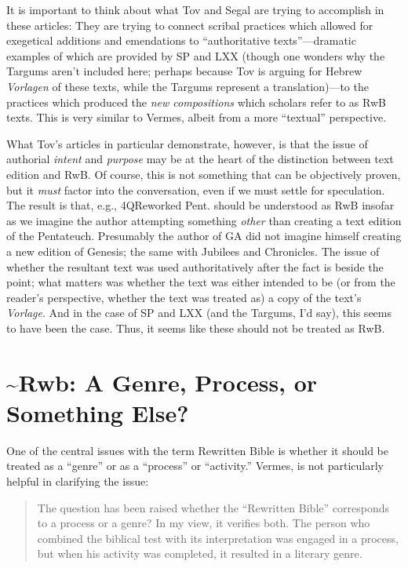 It is important to think about what Tov and Segal are trying to
accomplish in these articles: They are trying to connect scribal
practices which allowed for exegetical additions and emendations to
``authoritative texts''---dramatic examples of which are provided by SP
and LXX (though one wonders why the Targums aren't included here;
perhaps because Tov is arguing for Hebrew \emph{Vorlagen} of these
texts, while the Targums represent a translation)---to the practices
which produced the \emph{new compositions} which scholars refer to as
RwB texts. This is very similar to Vermes, albeit from a more
``textual'' perspective.

What Tov's articles in particular demonstrate, however, is that the
issue of authorial \emph{intent} and \emph{purpose} may be at the heart
of the distinction between text edition and RwB. Of course, this is not
something that can be objectively proven, but it \emph{must} factor into
the conversation, even if we must settle for speculation. The result is
that, e.g., 4QReworked Pent. should be understood as RwB insofar as we
imagine the author attempting something \emph{other} than creating a
text edition of the Pentateuch. Presumably the author of GA did not
imagine himself creating a new edition of Genesis; the same with
Jubilees and Chronicles. The issue of whether the resultant text was
used authoritatively after the fact is beside the point; what matters
was whether the text was either intended to be (or from the reader's
perspective, whether the text was treated as) a copy of the text's
\emph{Vorlage}. And in the case of SP and LXX (and the Targums, I'd
say), this seems to have been the case. Thus, it seems like these should
not be treated as RwB.

\section{\textasciitilde{}Rwb: A Genre, Process, or Something
Else?}\label{rwb-a-genre-process-or-something-else}

One of the central issues with the term Rewritten Bible is whether it
should be treated as a ``genre'' or as a ``process'' or ``activity.''
Vermes, is not particularly helpful in clarifying the issue:

\begin{quote}
The question has been raised whether the ``Rewritten Bible'' corresponds
to a process or a genre? In my view, it verifies both. The person who
combined the biblical test with its interpretation was engaged in a
process, but when his activity was completed, it resulted in a literary
genre.\autocite[8]{vermes_zsengeller2014}
\end{quote}

